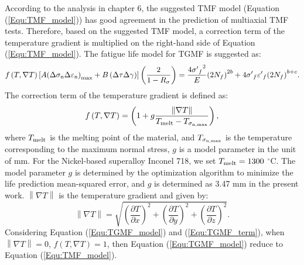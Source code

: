 According to the analysis in chapter 6, the suggested TMF model (Equation (\ref{Equ:TMF_model})) has good agreement in the prediction of multiaxial TMF tests.
Therefore, based on the suggested TMF model, a correction term of the temperature gradient is multiplied on the right-hand side of Equation (\ref{Equ:TMF_model}). The fatigue life model for TGMF is suggested as:
\begin{equation}
f\left( {T,\nabla T} \right)\left[ {A{{\left( {\Delta {\sigma _{\rm n}}\Delta {\varepsilon _{\rm n}}} \right)}_{\max }} + B\left( {\Delta \tau \Delta \gamma } \right)} \right]\left( {\frac{2}{{1 - {R_\sigma }}}} \right) = \frac{{4{{\sigma '}_f}^2}}{E}{\left( {2{N_f}} \right)^{2b}} + 4{{\sigma '}_f}{{\varepsilon '}_f}{\left( {2{N_f}} \right)^{b + c}}.
\label{Equ:TGMF_model}
\end{equation}
The correction term of the temperature gradient is defined as:
\begin{equation}
f\left( {T,\nabla T} \right) = \left( {1 + g\frac{{\left\| {\nabla T} \right\|}}{{{T_{{\rm{melt}}}} - {T_{{\sigma _{\rm n,\max }}}}}}} \right),
\label{Equ:TGMF_term}
\end{equation}
where ${T_{{\rm{melt}}}}$ is the melting point of the material, and ${T_{{\sigma _{\rm n,\max }}}}$ is the temperature corresponding to the maximum normal stress, $g$ is a model parameter in the unit of mm. For the Nickel-based superalloy Inconel 718, we set ${T_{{\rm{melt}}}}=1300$ $^\circ$C. The model parameter $g$ is determined by the optimization algorithm to minimize the life prediction
mean-squared error, and $g$ is determined as 3.47 mm in the present work. ${\left\| {\nabla T} \right\|}$ is the temperature gradient and given by:
\begin{equation}
\left\| {\nabla T} \right\| = \sqrt {{{\left( {\frac{{\partial T}}{{\partial x}}} \right)}^2} + {{\left( {\frac{{\partial T}}{{\partial y}}} \right)}^2} + {{\left( {\frac{{\partial T}}{{\partial z}}} \right)}^2}}.
\end{equation}
Considering Equation (\ref{Equ:TGMF_model}) and (\ref{Equ:TGMF_term}), when $\left\| {\nabla T} \right\|=0$, $f\left( {T,\nabla T} \right)=1$, then Equation (\ref{Equ:TGMF_model}) reduce to Equation (\ref{Equ:TMF_model}).


